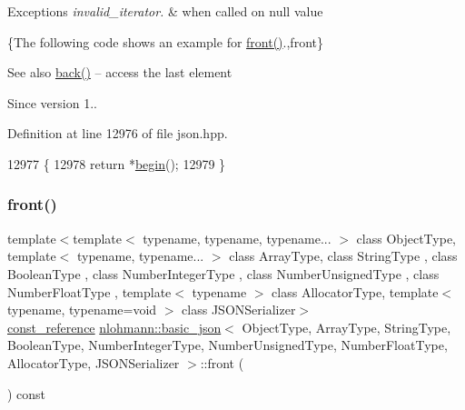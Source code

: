 \begin{DoxyExceptions}{Exceptions}
{\em invalid\+\_\+iterator.} & when called on {\ttfamily null} value\\
\hline
\end{DoxyExceptions}
\{The following code shows an example for {\ttfamily \hyperlink{classnlohmann_1_1basic__json_a3acba9c6ceb7214e565fe08c3ba5b352}{front()}}.,front\}

\begin{DoxySeeAlso}{See also}
\hyperlink{classnlohmann_1_1basic__json_a011397134847f36db0ed7d7a93753677}{back()} -- access the last element
\end{DoxySeeAlso}
\begin{DoxySince}{Since}
version 1.. 
\end{DoxySince}


Definition at line 12976 of file json.\+hpp.


\begin{DoxyCode}
12977     \{
12978         \textcolor{keywordflow}{return} *\hyperlink{classnlohmann_1_1basic__json_a0ff28dac23f2bdecee9564d07f51dcdc}{begin}();
12979     \}
\end{DoxyCode}
\mbox{\label{classnlohmann_1_1basic__json_a4b1fb3671ade9afc8d33b2c9510acbfc}} 
\subsubsection{\texorpdfstring{front()}{front()}\hspace{0.1cm}{\footnotesize\ttfamily [2/2]}}
{\footnotesize\ttfamily template$<$template$<$ typename, typename, typename... $>$ class Object\+Type, template$<$ typename, typename... $>$ class Array\+Type, class String\+Type , class Boolean\+Type , class Number\+Integer\+Type , class Number\+Unsigned\+Type , class Number\+Float\+Type , template$<$ typename $>$ class Allocator\+Type, template$<$ typename, typename=void $>$ class J\+S\+O\+N\+Serializer$>$ \\
\hyperlink{classnlohmann_1_1basic__json_a4057c5425f4faacfe39a8046871786ca}{const\+\_\+reference} \hyperlink{classnlohmann_1_1basic__json}{nlohmann\+::basic\+\_\+json}$<$ Object\+Type, Array\+Type, String\+Type, Boolean\+Type, Number\+Integer\+Type, Number\+Unsigned\+Type, Number\+Float\+Type, Allocator\+Type, J\+S\+O\+N\+Serializer $>$\+::front (\begin{DoxyParamCaption}{ }\end{DoxyParamCaption}) const\hspace{0.3cm}{\ttfamily [inline]}}



